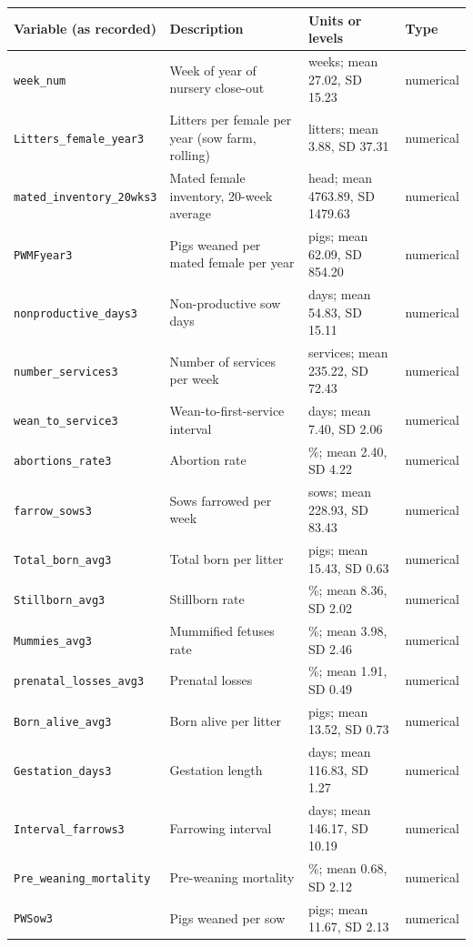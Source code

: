 \begin{longtable}{p{4.1cm} p{5.6cm} p{4.9cm} p{1.5cm}}
\hline
Variable (as recorded) & Description & Units or levels & Type \\
\hline
\endhead
\texttt{week\_num} & Week of year of nursery close-out & weeks; mean 27.02, SD 15.23 & numerical \\
\texttt{Litters\_female\_year3} & Litters per female per year (sow farm, rolling) & litters; mean 3.88, SD 37.31 & numerical \\
\texttt{mated\_inventory\_20wks3} & Mated female inventory, 20-week average & head; mean 4763.89, SD 1479.63 & numerical \\
\texttt{PWMFyear3} & Pigs weaned per mated female per year & pigs; mean 62.09, SD 854.20 & numerical \\
\texttt{nonproductive\_days3} & Non-productive sow days & days; mean 54.83, SD 15.11 & numerical \\
\texttt{number\_services3} & Number of services per week & services; mean 235.22, SD 72.43 & numerical \\
\texttt{wean\_to\_service3} & Wean-to-first-service interval & days; mean 7.40, SD 2.06 & numerical \\
\texttt{abortions\_rate3} & Abortion rate & \%; mean 2.40, SD 4.22 & numerical \\
\texttt{farrow\_sows3} & Sows farrowed per week & sows; mean 228.93, SD 83.43 & numerical \\
\texttt{Total\_born\_avg3} & Total born per litter & pigs; mean 15.43, SD 0.63 & numerical \\
\texttt{Stillborn\_avg3} & Stillborn rate & \%; mean 8.36, SD 2.02 & numerical \\
\texttt{Mummies\_avg3} & Mummified fetuses rate & \%; mean 3.98, SD 2.46 & numerical \\
\texttt{prenatal\_losses\_avg3} & Prenatal losses & \%; mean 1.91, SD 0.49 & numerical \\
\texttt{Born\_alive\_avg3} & Born alive per litter & pigs; mean 13.52, SD 0.73 & numerical \\
\texttt{Gestation\_days3} & Gestation length & days; mean 116.83, SD 1.27 & numerical \\
\texttt{Interval\_farrows3} & Farrowing interval & days; mean 146.17, SD 10.19 & numerical \\
\texttt{Pre\_weaning\_mortality} & Pre-weaning mortality & \%; mean 0.68, SD 2.12 & numerical \\
\texttt{PWSow3} & Pigs weaned per sow & pigs; mean 11.67, SD 2.13 & numerical \\

\end{longtable}
